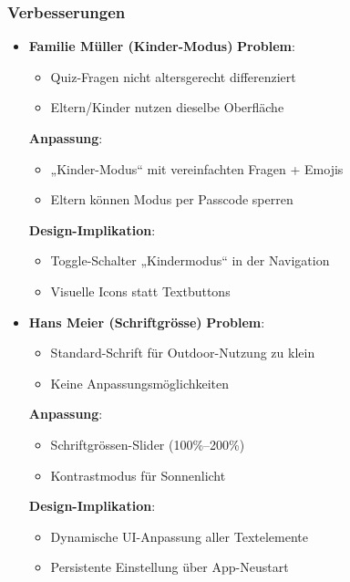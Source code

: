 \documentclass[10pt]{article}
\begin{document}
\subsubsection{Verbesserungen}
\begin{itemize}
	\item \textbf{Familie Müller (Kinder-Modus)}
	\subitem \textbf{Problem}: 
	\begin{itemize}
		\item Quiz-Fragen nicht altersgerecht differenziert
		\item Eltern/Kinder nutzen dieselbe Oberfläche
	\end{itemize}
	\subitem \textbf{Anpassung}: 
	\begin{itemize}
		\item „Kinder-Modus“ mit vereinfachten Fragen + Emojis
		\item Eltern können Modus per Passcode sperren
	\end{itemize}
	\subitem \textbf{Design-Implikation}: 
	\begin{itemize}
		\item Toggle-Schalter „Kindermodus“ in der Navigation
		\item Visuelle Icons statt Textbuttons
	\end{itemize}
	
	\item \textbf{Hans Meier (Schriftgrösse)}
	\subitem \textbf{Problem}: 
	\begin{itemize}
		\item Standard-Schrift für Outdoor-Nutzung zu klein
		\item Keine Anpassungsmöglichkeiten
	\end{itemize}
	\subitem \textbf{Anpassung}: 
	\begin{itemize}
		\item Schriftgrössen-Slider (100\%–200\%)
		\item Kontrastmodus für Sonnenlicht
	\end{itemize}
	\subitem \textbf{Design-Implikation}: 
	\begin{itemize}
		\item Dynamische UI-Anpassung aller Textelemente
		\item Persistente Einstellung über App-Neustart
	\end{itemize}
	

\end{itemize}
\end{document}
